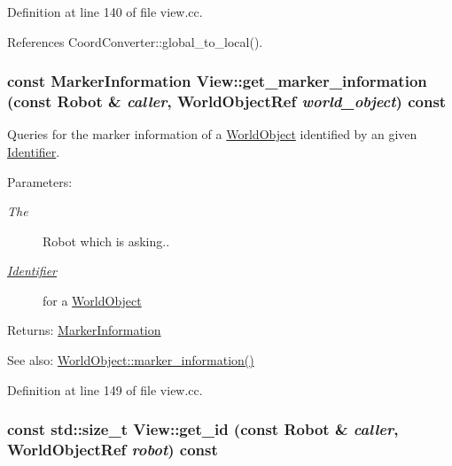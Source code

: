 Definition at line 140 of file view.cc.

References CoordConverter::global\_\-to\_\-local().\hypertarget{class_view_7b23348169617597ddb74988fb3ce3e1}{
\subsubsection[get\_\-marker\_\-information]{\setlength{\rightskip}{0pt plus 5cm}const {\bf MarkerInformation} View::get\_\-marker\_\-information (const Robot \& {\em caller}, \/  WorldObjectRef {\em world\_\-object}) const}}
\label{class_view_7b23348169617597ddb74988fb3ce3e1}


Queries for the marker information of a \hyperlink{class_world_object}{WorldObject} identified by an given \hyperlink{class_identifier}{Identifier}. \begin{Desc}
\item[Parameters:]
\begin{description}
\item[{\em The}]Robot which is asking.. \item[{\em \hyperlink{class_identifier}{Identifier}}]for a \hyperlink{class_world_object}{WorldObject} \end{description}
\end{Desc}
\begin{Desc}
\item[Returns:]\hyperlink{class_marker_information}{MarkerInformation} \end{Desc}
\begin{Desc}
\item[See also:]\hyperlink{class_world_object_1dd7d80498c6b502ad9870c54cbf4305}{WorldObject::marker\_\-information()} \end{Desc}


Definition at line 149 of file view.cc.\hypertarget{class_view_865976d08746c6414ae0068904cf8f9c}{
\subsubsection[get\_\-id]{\setlength{\rightskip}{0pt plus 5cm}const std::size\_\-t View::get\_\-id (const Robot \& {\em caller}, \/  WorldObjectRef {\em robot}) const}}
\label{class_view_865976d08746c6414ae0068904cf8f9c}


